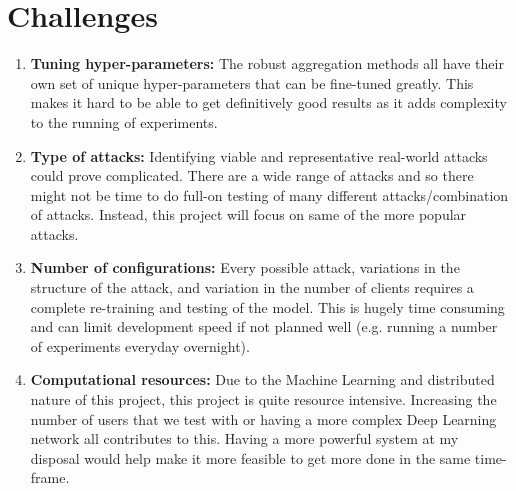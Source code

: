 \section{Challenges}
\begin{enumerate}
    \item \textbf{Tuning hyper-parameters:} The robust aggregation methods all have their own set of unique hyper-parameters that can be fine-tuned greatly.
    This makes it hard to be able to get definitively good results as it adds complexity to the running of experiments.
        
    \item \textbf{Type of attacks:} Identifying viable and representative real-world attacks could prove complicated. There are a wide range of attacks and so there might not be time to do full-on testing of many different attacks/combination of attacks. Instead, this project will focus on same of the more popular attacks.

    \item \textbf{Number of configurations:}  Every possible attack, variations in the structure of the attack, and variation in the number of clients requires a complete re-training and testing of the model. This is hugely time consuming and can limit development speed if not planned well (e.g. running a number of experiments everyday overnight).
    
    \item \textbf{Computational resources:}
    Due to the Machine Learning and distributed nature of this project, this project is quite resource intensive. 
    Increasing the number of users that we test with or having a more complex Deep Learning network all contributes to this.
    Having a more powerful system at my disposal would help make it more feasible to get more done in the same time-frame.
\end{enumerate}